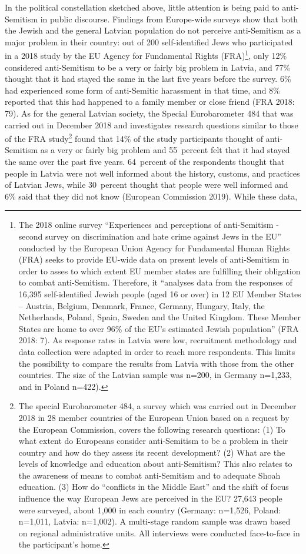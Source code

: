 In the political constellation sketched above, little attention is being paid to anti-Semitism in public discourse. Findings from Europe-wide surveys show that both the Jewish and the general Latvian population do not perceive anti-Semitism as a major problem in their country: out of 200 self-identified Jews who participated in a 2018 study by the EU Agency for Fundamental Rights (FRA)\footnote{The 2018 online survey ``Experiences and perceptions of anti-Semitism - second survey on discrimination and hate crime against Jews in the EU'' conducted by the European Union Agency for Fundamental Human Rights (FRA) seeks to provide EU-wide data on present levels of anti-Semitism in order to asses to which extent EU member states are fulfilling their obligation to combat anti-Semitism. Therefore, it ``analyses data from the responses of 16,395 self-identified Jewish people (aged 16 or over) in 12 EU Member States – Austria, Belgium, Denmark, France, Germany, Hungary, Italy, the Netherlands, Poland, Spain, Sweden and the United Kingdom. These Member States are home to over 96\% of the EU’s estimated Jewish population'' (FRA 2018: 7). As response rates in Latvia were low, recruitment methodology and data collection were adapted in order to reach more respondents. This limits the possibility to compare the results from Latvia with those from the other countries. The size of the Latvian sample was n=200, in Germany n=1,233, and in Poland n=422).}, only 12\% considered anti-Semitism to be a very or fairly big problem in Latvia, and 77\% thought that it had stayed the same in the last five years before the survey. 6\% had experienced some form of anti-Semitic harassment in that time, and 8\% reported that this had happened to a family member or close friend (FRA 2018: 79). As for the general Latvian society, the Special Eurobarometer 484 that was carried out in December 2018 and investigates research questions similar to those of the FRA study\footnote{The special Eurobarometer 484, a survey which was carried out in December 2018 in 28 member countries of the European Union based on a request by the European Commission, covers the following research questions: (1) To what extent do Europeans consider anti-Semitism to be a problem in their country and how do they assess its recent development? (2) What are the levels of knowledge and education about anti-Semitism? This also relates to the awareness of means to combat anti-Semitism and to adequate Shoah education. (3) How do ``conflicts in the Middle East'' and the shift of focus influence the way European Jews are perceived in the EU? 27,643 people were surveyed, about 1,000 in each country (Germany: n=1,526, Poland: n=1,011, Latvia: n=1,002). A multi-stage random sample was drawn based on regional administrative units. All interviews were conducted face-to-face in the participant's home.} found that 14\% of the study participants thought of anti-Semitism as a very or fairly big problem and 55\ percent felt that it had stayed the same over the past five years. 64\ percent of the respondents thought that people in Latvia were not well informed about the history, customs, and practices of Latvian Jews, while 30\ percent thought that people were well informed and 6\% said that they did not know (European Commission 2019). While these data, 